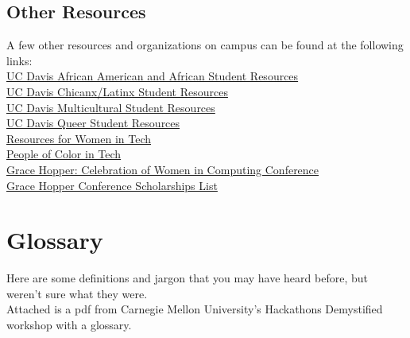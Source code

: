 \documentclass{article}
\begin{document}
\subsection {Other Resources} 
A few other resources and organizations on campus can be found at the following links:  \\

\href{https://www.ucdavis.edu/admissions/undergraduate/community/african-american-student-resources/}{UC Davis African American and African Student Resources}\\

\href{https://www.ucdavis.edu/admissions/undergraduate/community/latino-chicano-organizations/}{UC Davis Chicanx/Latinx Student Resources}\\

\href{https://www.ucdavis.edu/admissions/undergraduate/community/}{UC Davis Multicultural Student Resources}\\

\href{http://lgbtqia.ucdavis.edu/connected/student-org.html}{UC Davis Queer Student Resources}\\

\href{https://github.com/cristianoliveira/awesome4girls}{Resources for Women in Tech} \\

\href{http://peopleofcolorintech.com/}{People of Color in Tech}\\

\href{http://ghc.anitaborg.org/}{Grace Hopper: Celebration of Women in Computing Conference}\\

\href{https://github.com/freialobo/GHC-Scholarships}{Grace Hopper Conference Scholarships List}\\
\newpage
\section{Glossary}
\label{sec:glossary}
\hspace{0.5cm} Here are some definitions and jargon that you may have heard before, but weren't sure what they were. \\

Attached is a pdf from Carnegie Mellon University's Hackathons Demystified workshop with a glossary. \\

\end{document}
